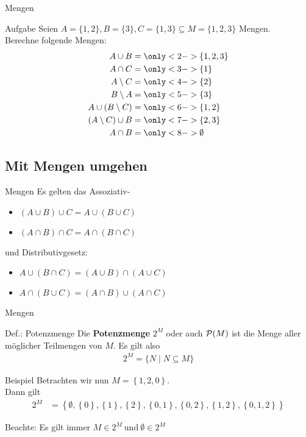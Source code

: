 	\begin{frame}{Mengen}
	\begin{exampleblock}{Aufgabe}
		Seien $A = \{1, 2\}, B = \{3\}, C = \{1, 3\}  \subseteq M = \{1, 2, 3\}$ Mengen.\\
		Berechne folgende Mengen:
		\begin{align*}
		A \cup B &= \only<2->{ \{1, 2, 3\} }  \\
		A \cap C &= \only<3->{ \{1\} }\\
		A \setminus C &= \only<4->{ \{2\} }\\
		B \setminus A &= \only<5->{ \{3\} }\\
		A \cup (B \setminus C) &= \only<6->{ \{1, 2\} }\\
		(A \setminus C) \cup B &= \only<7->{ \{2, 3\} }\\
		A \cap B &= \only<8->{ \emptyset }
		\end{align*}
	\end{exampleblock}
\end{frame}

\subsection{Mit Mengen umgehen}
	\begin{frame}{Mengen}
		Es gelten das Assoziativ- \\
			\begin{itemize}
				\item $(A\cup B) \cup C=A\cup(B\cup C)$
				\item $(A\cap B) \cap C=A\cap(B\cap C)$
			\end{itemize}
		und Distributivgesetz:\\
			\begin{itemize}
				\item $A\cup(B \cap C)=(A\cup B)\cap (A\cup C)$
				\item $A\cap(B \cup C)=(A\cap B)\cup (A\cap C)$
			\end{itemize}
	\end{frame}

	\begin{frame}{Mengen}
		\begin{block}{Def.: Potenzmenge}
		Die \textbf{Potenzmenge} $2^M$ oder auch $\mathcal{P} (M)$ ist die Menge aller möglicher Teilmengen von $M$. Es gilt also 
		\begin{align*}
			2^M = \{N \mid N \subseteq M\}
		\end{align*}
		\end{block}
		\pause
		\begin{exampleblock}{Beispiel}
		Betrachten wir nun   $M = \left\{ 1,2,0 \right\} $. \\
		Dann gilt 
		\begin{align*}
		2^M &= \left\{ \emptyset, \left\{ 0 \right\}, \left\{ 1 \right\}, \left\{ 2 \right\}, \left\{ 0,1 \right\} , \left\{ 0,2 \right\}, \left\{ 1,2 \right\}, \left\{ 0,1,2 \right\} \right\}
		\end{align*}
		
		Beachte: Es gilt immer $M \in 2^M \ \text{und} \ \emptyset \in 2^M$
		\end{exampleblock}
	\end{frame}

